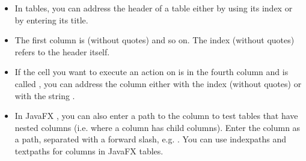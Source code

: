 \begin{itemize}
\item In tables, you can address the header of a table either by using its index or by entering its title. 
\item The first column is  (without quotes)  and so on. The index  (without quotes) refers to the header itself. 
\item If the cell you want to execute an action on is in the fourth column and is called , you can address the column either with the index  (without quotes) or with the string . 
\item In JavaFX \gdauts{}, you can also enter a path to the column to test tables that have nested columns (i.e. where a column has child columns). Enter the column as a path, separated with a forward slash, e.g. . You can use indexpaths and textpaths for columns in JavaFX tables. 

\end{itemize}   


